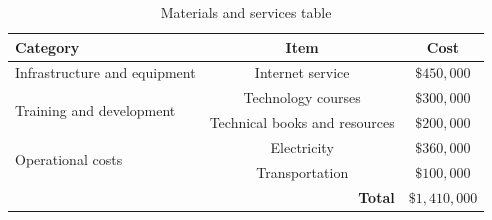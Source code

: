 \begin{table}[H]
    \centering
    \small
    \caption{Materials and services table}
    \label{tab:direct_costs}
    \begin{tabularx}{\textwidth}{Xcc}
        \toprule
        \textbf{Category}                  & \textbf{Item}                 & \textbf{Cost} \\
        \midrule
        Infrastructure and equipment       & Internet service              & \(\$450,000\) \\
        \midrule
        \multirow{2}{*}{Training and development}
                                           & Technology courses            & \(\$300,000\) \\
                                           & Technical books and resources & \(\$200,000\) \\
        \midrule
        \multirow{2}{*}{Operational costs}
                                           & Electricity                   & \(\$360,000\) \\
                                           & Transportation                & \(\$100,000\) \\
        \midrule
        \multicolumn{2}{r}{\textbf{Total}} & \(\$1,410,000\)                               \\
        \bottomrule
    \end{tabularx}
\end{table}
